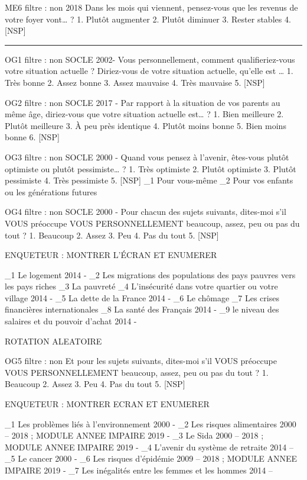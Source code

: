 \documentclass[12pt,a4paper]{reedthesis}
\begin{document}
ME6 filtre : non 2018
Dans les mois qui viennent, pensez-vous que les revenus de votre foyer vont\ldots{} ?
1. Plutôt augmenter
2. Plutôt diminuer
3. Rester stables
4. {[}NSP{]}
\begin{center}\rule{0.5\linewidth}{0.5pt}\end{center}

OG1 filtre : non SOCLE 2002-
Vous personnellement, comment qualifieriez-vous votre situation actuelle ? Diriez-vous de votre situation actuelle, qu'elle est \ldots{}
1. Très bonne
2. Assez bonne
3. Assez mauvaise
4. Très mauvaise
5. {[}NSP{]}

OG2 filtre : non SOCLE 2017 -
Par rapport à la situation de vos parents au même âge, diriez-vous que votre situation actuelle est\ldots{} ?
1. Bien meilleure
2. Plutôt meilleure
3. À peu près identique
4. Plutôt moins bonne
5. Bien moins bonne
6. {[}NSP{]}

OG3 filtre : non SOCLE 2000 -
Quand vous pensez à l'avenir, êtes-vous plutôt optimiste ou plutôt pessimiste\ldots{} ?
1. Très optimiste
2. Plutôt optimiste
3. Plutôt pessimiste
4. Très pessimiste
5. {[}NSP{]}
\_1 Pour vous-même
\_2 Pour vos enfants ou les générations futures

OG4 filtre : non SOCLE 2000 -
Pour chacun des sujets suivants, dites-moi s'il VOUS préoccupe VOUS PERSONNELLEMENT beaucoup, assez, peu ou pas du tout ?
1. Beaucoup
2. Assez
3. Peu
4. Pas du tout
5. {[}NSP{]}

ENQUETEUR : MONTRER L'ÉCRAN ET ENUMERER

\_1 Le logement 2014 -
\_2 Les migrations des populations des pays pauvres vers les pays riches
\_3 La pauvreté
\_4 L'insécurité dans votre quartier ou votre village 2014 -
\_5 La dette de la France 2014 -
\_6 Le chômage
\_7 Les crises financières internationales
\_8 La santé des Français 2014 -
\_9 le niveau des salaires et du pouvoir d'achat 2014 -

ROTATION ALEATOIRE

OG5 filtre : non
Et pour les sujets suivants, dites-moi s'il VOUS préoccupe VOUS PERSONNELLEMENT beaucoup, assez, peu ou pas du tout ?
1. Beaucoup
2. Assez
3. Peu
4. Pas du tout
5. {[}NSP{]}

ENQUETEUR : MONTRER ECRAN ET ENUMERER

\_1 Les problèmes liés à l'environnement 2000 -
\_2 Les risques alimentaires 2000 -- 2018 ; MODULE ANNEE IMPAIRE 2019 -
\_3 Le Sida 2000 -- 2018 ; MODULE ANNEE IMPAIRE 2019 -
\_4 L'avenir du système de retraite 2014 --
\_5 Le cancer 2000 -
\_6 Les risques d'épidémie 2009 -- 2018 ; MODULE ANNEE IMPAIRE 2019 -
\_7 Les inégalités entre les femmes et les hommes 2014 --
\end{document}
